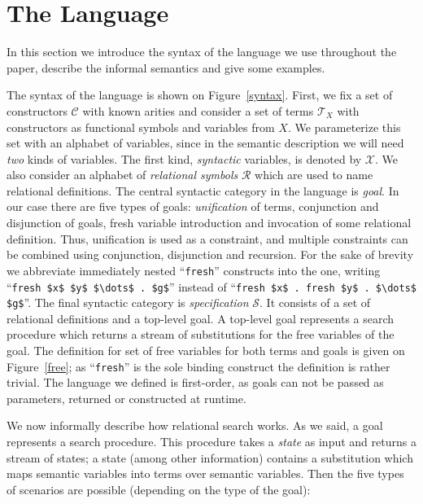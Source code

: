 \section{The Language}
\label{language}
 
In this section we introduce the syntax of the language we use throughout the paper, describe the informal semantics and give some examples.

The syntax of the language is shown on Figure~\ref{syntax}. First, we fix a set of constructors $\mathcal{C}$ with known arities and consider
a set of terms $\mathcal{T}_X$ with constructors as functional symbols and variables from $X$. We parameterize this set with an alphabet of
variables, since in the semantic description we will need \emph{two} kinds of variables. The first kind, \emph{syntactic} variables, is denoted
by $\mathcal{X}$. We also consider an alphabet of \emph{relational symbols} $\mathcal{R}$ which are used to name relational definitions.
The central syntactic category in the language is \emph{goal}. In our case there are five types of goals: \emph{unification} of terms,
conjunction and disjunction of goals, fresh variable introduction and invocation of some relational definition. Thus, unification is used
as a constraint, and multiple constraints can be combined using conjunction, disjunction and recursion. For the sake of brevity we
abbreviate immediately nested ``\lstinline|fresh|'' constructs into the one, writing ``\lstinline|fresh $x$ $y$ $\dots$ . $g$|'' instead of
``\lstinline|fresh $x$ . fresh $y$ . $\dots$ $g$|''. The final syntactic category is \emph{specification} $\mathcal{S}$. It consists of a set
of relational definitions and a top-level goal. A top-level goal represents a search procedure which returns a stream of substitutions for
the free variables of the goal. The definition for set of free variables for both terms and goals is given on Figure~\ref{free}; as ``\lstinline|fresh|''
is the sole binding construct the definition is rather trivial. The language we defined is first-order, as goals can not be passed as parameters,
returned or constructed at runtime.

We now informally describe how relational search works. As we said, a goal represents a search procedure. This procedure takes a \emph{state} as input and returns a
stream of states; a state (among other information) contains a substitution which maps semantic variables into terms over semantic variables. Then the five types of
scenarios are possible (depending on the type of the goal):

